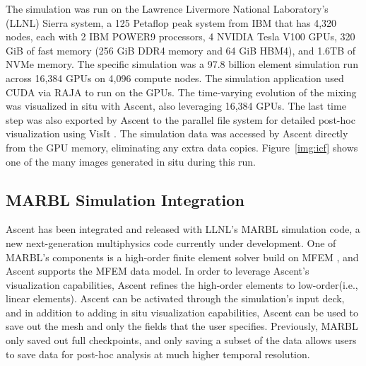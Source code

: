 The simulation was run on the Lawrence Livermore National Laboratory's (LLNL)
Sierra system, a 125 Petaflop peak system from IBM that has 4,320 nodes,
each with 2 IBM POWER9 processors, 4 NVIDIA Tesla V100 GPUs, 320 GiB of
fast memory (256 GiB DDR4 memory and 64 GiB HBM4), and 1.6TB of NVMe
memory. The specific simulation was a 97.8 billion element simulation
run across 16,384 GPUs on 4,096 compute nodes. The simulation application
used CUDA via RAJA to run on the GPUs. The time-varying evolution of the
mixing was visualized in situ with Ascent, also leveraging 16,384 GPUs.
The last time step was also exported by Ascent to the parallel file
system for detailed post-hoc visualization using VisIt . The simulation
data was accessed by Ascent directly from the GPU memory, eliminating any
extra data copies.
Figure~\ref{img:icf} shows one of the many images generated in situ during
this run.

\subsection{MARBL Simulation Integration}
Ascent has been integrated and released with LLNL's MARBL simulation code,
a new next-generation multiphysics code currently under development.
%
One of MARBL's components is a high-order finite element solver build on
MFEM , and Ascent supports the MFEM data model.
%
In order to leverage Ascent's visualization capabilities, Ascent refines
the high-order elements to low-order(i.e., linear elements).
%
Ascent can be activated through the simulation's input deck, and in addition
to adding in situ visualization capabilities, Ascent can be used to save out
the mesh and only the fields that the user specifies.
%
Previously, MARBL only saved out full checkpoints, and only saving a subset of the
data allows users to save data for post-hoc analysis at much higher temporal resolution.

